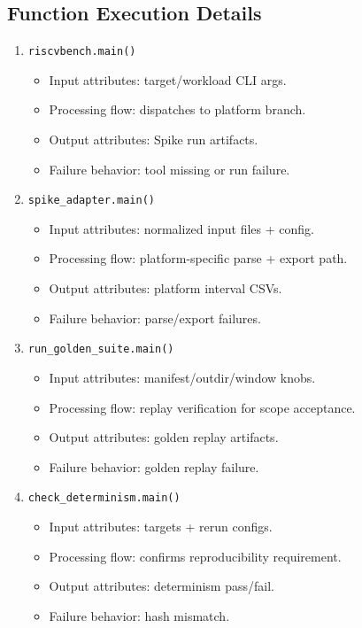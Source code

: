 \documentclass[11pt,a4paper]{article}
\begin{document}
\subsection*{Function Execution Details}
\begin{enumerate}[leftmargin=*]
  \item \texttt{riscvbench.main()}
  \begin{itemize}[leftmargin=*]
    \item Input attributes: target/workload CLI args.
    \item Processing flow: dispatches to platform branch.
    \item Output attributes: Spike run artifacts.
    \item Failure behavior: tool missing or run failure.
  \end{itemize}
  \item \texttt{spike\_adapter.main()}
  \begin{itemize}[leftmargin=*]
    \item Input attributes: normalized input files + config.
    \item Processing flow: platform-specific parse + export path.
    \item Output attributes: platform interval CSVs.
    \item Failure behavior: parse/export failures.
  \end{itemize}
  \item \texttt{run\_golden\_suite.main()}
  \begin{itemize}[leftmargin=*]
    \item Input attributes: manifest/outdir/window knobs.
    \item Processing flow: replay verification for scope acceptance.
    \item Output attributes: golden replay artifacts.
    \item Failure behavior: golden replay failure.
  \end{itemize}
  \item \texttt{check\_determinism.main()}
  \begin{itemize}[leftmargin=*]
    \item Input attributes: targets + rerun configs.
    \item Processing flow: confirms reproducibility requirement.
    \item Output attributes: determinism pass/fail.
    \item Failure behavior: hash mismatch.
  \end{itemize}
\end{enumerate}
\end{document}
